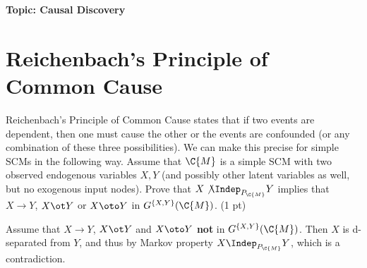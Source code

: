 
\flushleft\textbf{Topic: Causal Discovery}

\section{Reichenbach's Principle of Common Cause}
Reichenbach's Principle of Common Cause states that if two events are dependent,
then one must cause the other or the events are confounded (or any combination of these three possibilities).
We can make this precise for simple SCMs in the following way. Assume that $\C{M}$
is a simple SCM with two observed endogenous variables $X,Y$ (and possibly other
latent variables as well, but no exogenous input nodes). Prove that 
$X \not\Indep_{P_{\C{M}}} Y$
implies that $X \to Y$,
$X \ot Y$ or $X \oto Y$ in $G^{\{X,Y\}}(\C{M})$. (1 pt)

\begin{gradedsolution}
Assume that $X \to Y$, $X \ot Y$ and $X \oto Y$ \textbf{not} in $G^{\{X,Y\}}(\C{M})$. Then $X$ is d-separated from $Y$, and thus by Markov property $X \Indep_{P_{\C{M}}} Y$, which is a contradiction.
\end{gradedsolution}

